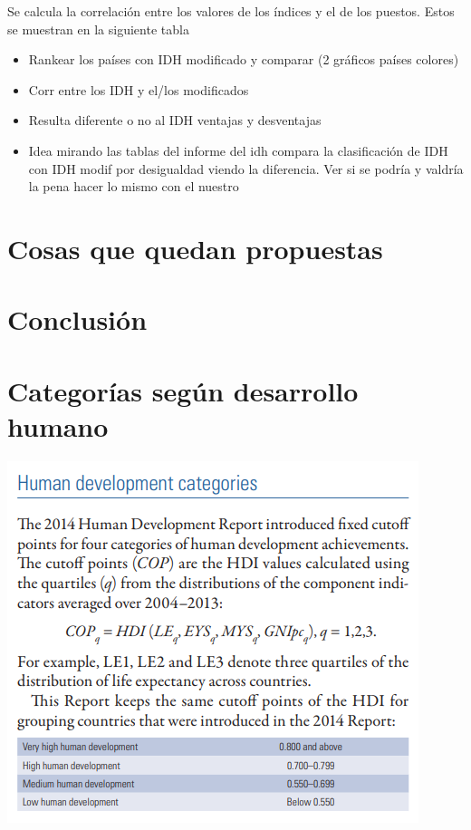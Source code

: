 \documentclass[
  10pt,
]{article}
\begin{document}
Se calcula la correlación entre los valores de los índices y el de los
puestos. Estos se muestran en la siguiente tabla

\begin{itemize}
\item
  Rankear los países con IDH modificado y comparar (2 gráficos países
  colores)
\item
  Corr entre los IDH y el/los modificados
\item
  Resulta diferente o no al IDH ventajas y desventajas
\item
  Idea mirando las tablas del informe del idh compara la clasificación
  de IDH con IDH modif por desigualdad viendo la diferencia. Ver si se
  podría y valdría la pena hacer lo mismo con el nuestro
\end{itemize}

\section{Cosas que quedan propuestas}\label{cosas-que-quedan-propuestas}

\section{Conclusión}\label{conclusiuxf3n}

\section{Categorías según desarrollo
humano}\label{categoruxedas-seguxfan-desarrollo-humano}

\includegraphics{agregar1.png}
\end{document}
